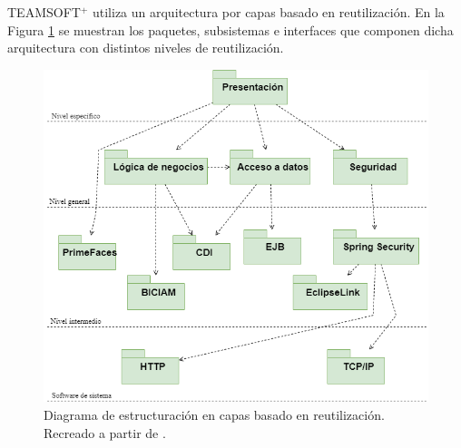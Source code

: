 TEAMSOFT$^+$ utiliza un arquitectura por capas basado en reutilización. En la Figura \ref{fig:diagrama-paquetes} se muestran los paquetes, subsistemas e interfaces que componen dicha arquitectura con distintos niveles de reutilización. 

\begin{figure}[H]
	\centering
	\includegraphics[width=.7\textwidth]{figuras/diagrama-paquetes.png}
	\caption{Diagrama de estructuración en capas basado en reutilización. Recreado a partir de \cite{Duran2019}.} \label{fig:diagrama-paquetes}
\end{figure}

